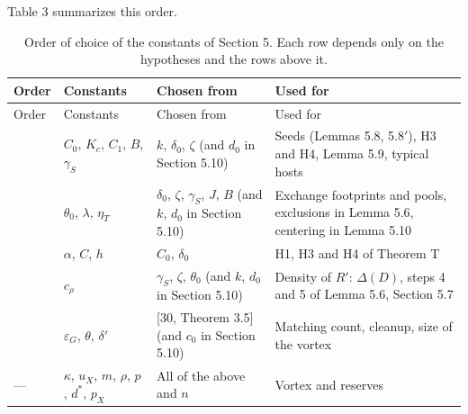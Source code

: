 \documentclass[english,11pt,a4paper]{article}
\begin{document}
Table 3 summarizes this order.

\begin{longtable}[]{@{}
  >{\raggedright\arraybackslash}p{}
  >{\raggedright\arraybackslash}p{}
  >{\raggedright\arraybackslash}p{}
  >{\raggedright\arraybackslash}p{}@{}}
\caption{Order of choice of the constants of Section 5. Each row depends only on the hypotheses and the rows above it.}\tabularnewline
\toprule\noalign{}
\begin{minipage}[b]{\linewidth}\raggedright
Order
\end{minipage} & \begin{minipage}[b]{\linewidth}\raggedright
Constants
\end{minipage} & \begin{minipage}[b]{\linewidth}\raggedright
Chosen from
\end{minipage} & \begin{minipage}[b]{\linewidth}\raggedright
Used for
\end{minipage} \\
\midrule\noalign{}
\endfirsthead
\toprule\noalign{}
\begin{minipage}[b]{\linewidth}\raggedright
Order
\end{minipage} & \begin{minipage}[b]{\linewidth}\raggedright
Constants
\end{minipage} & \begin{minipage}[b]{\linewidth}\raggedright
Chosen from
\end{minipage} & \begin{minipage}[b]{\linewidth}\raggedright
Used for
\end{minipage} \\
\midrule\noalign{}
\endhead
\bottomrule\noalign{}
\endlastfoot
1 & \(C_0\), \(K_c\), \(C_1\), \(B\), \(\gamma_S\) & \(k\), \(\delta_0\), \(\zeta\) (and \(d_0\) in Section 5.10) & Seeds (Lemmas 5.8, 5.8\('\)), H3 and H4, Lemma 5.9, typical hosts \\
2 & \(\theta_0\), \(\lambda\), \(\eta_T\) & \(\delta_0\), \(\zeta\), \(\gamma_S\), \(J\), \(B\) (and \(k\), \(d_0\) in Section 5.10) & Exchange footprints and pools, exclusions in Lemma 5.6, centering in Lemma 5.10 \\
3 & \(\alpha\), \(C\), \(h\) & \(C_0\), \(\delta_0\) & H1, H3 and H4 of Theorem T \\
4 & \(c_\rho\) & \(\gamma_S\), \(\zeta\), \(\theta_0\) (and \(k\), \(d_0\) in Section 5.10) & Density of \(R'\): \(\Delta(D)\), steps 4 and 5 of Lemma 5.6, Section 5.7 \\
5 & \(\varepsilon_G\), \(\theta\), \(\delta'\) & {[}30, Theorem 3.5{]} (and \(c_0\) in Section 5.10) & Matching count, cleanup, size of the vortex \\
--- & \(\kappa\), \(u_X\), \(m\), \(\rho\), \(p\), \(d^*\), \(p_X\) & All of the above and \(n\) & Vortex and reserves \\
\end{longtable}
\end{document}
